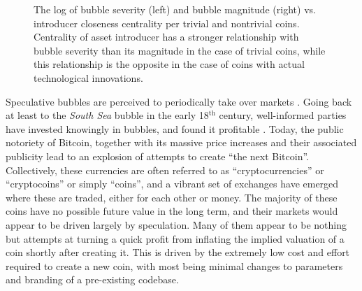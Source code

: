 \begin{figure*}
\centering
\begin{subfigure}
{\texttt{[image: log\_severity\_centrality.pdf]}}
\end{subfigure}
\begin{subfigure}
{\texttt{[image: log\_volume\_centrality.pdf]}}
\end{subfigure}
\label{volume_severity_centrality}
\caption{The log of bubble severity (left) and bubble magnitude (right) vs. introducer closeness centrality per trivial and nontrivial coins. Centrality of asset introducer has a stronger relationship with bubble severity than its magnitude in the case of trivial coins, while this relationship is the opposite in the case of coins with actual technological innovations.}
\end{figure*}

Speculative bubbles are perceived to periodically take over markets \cite{garber2001famous}.
Going back at least to the \emph{South Sea} bubble in the early 18$^{\text{th}}$ century, well-informed parties  have invested knowingly in bubbles, and found it profitable \cite{temin2004riding}.
Today, the public notoriety of Bitcoin, together with its massive price increases and their associated publicity lead to an explosion of attempts to create ``the next Bitcoin''.
Collectively, these currencies are often referred to as ``cryptocurrencies'' or ``cryptocoins'' or simply ``coins'', and a vibrant set of exchanges have emerged where these are traded, either for each other or money.
The majority of these coins have no possible future value in the long term, and their markets would appear to be driven largely by speculation.
Many of them appear to be nothing but attempts at turning a quick profit from inflating the implied valuation of a coin shortly after creating it.
This is driven by the extremely low cost and effort required to create a new coin, with most being minimal changes to parameters and branding of a pre-existing codebase.

